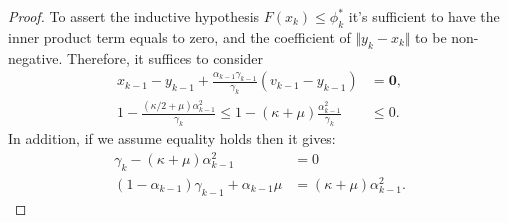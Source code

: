 \documentclass[12pt]{article}
\begin{document}
\begin{proof}
{            }
            To assert the inductive hypothesis $F(x_k) \le \phi_k^*$ it's sufficient to have the inner product term equals to zero, and the coefficient of $\Vert y_k - x_k\Vert$ to be non-negative. 
            Therefore, it suffices to consider 
            \begin{align*}
                x_{k - 1} - y_{k - 1}
                + 
                \frac{\alpha_{k - 1}\gamma_{k - 1}}{\gamma_k}
                (v_{k - 1} - y_{k - 1}) 
                &= 
                \mathbf 0, 
                \\
                1 - \frac{(\kappa/2 + \mu)\alpha_{k - 1}^2}{\gamma_k}
                \le 
                1 - (\kappa + \mu)\frac{\alpha_{k - 1}^2}{\gamma_k} 
                & \le 0. 
            \end{align*}
            In addition, if we assume equality holds then it gives: 
            \begin{align*}
                \gamma_k - (\kappa + \mu)\alpha_{k - 1}^2 
                &= 0
                \\
                (1 - \alpha_{k - 1})\gamma_{k - 1} + \alpha_{k - 1}\mu 
                &= (\kappa + \mu)\alpha_{k - 1}^2. 
            \end{align*}
        \end{proof}
\end{document}
